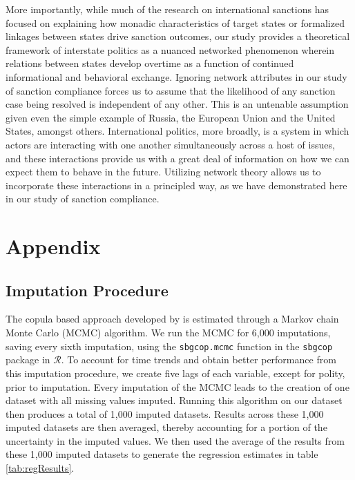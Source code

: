 More importantly, while much of the research on international sanctions has focused on explaining how monadic characteristics of target states or formalized linkages between states drive sanction outcomes, our study provides a theoretical framework of interstate politics as a nuanced networked phenomenon wherein relations between states develop overtime as a function of continued informational and behavioral exchange. Ignoring network attributes in our study of sanction compliance forces us to assume that the likelihood of any sanction case being resolved is independent of any other. This is an untenable assumption given even the simple example of Russia, the European Union and the United States, amongst others. International politics, more broadly, is a system in which actors are interacting with one another simultaneously across a host of issues, and these interactions provide us with a great deal of information on how we can expect them to behave in the future. Utilizing network theory allows us to incorporate these interactions in a principled way, as we have demonstrated here in our study of sanction compliance.

\newpage
\section*{Appendix}
\label{appendix}

\subsection*{Imputation Procedure}
\label{appImp}

The copula based approach developed by \citet{hoff:2007} is estimated through a Markov chain Monte Carlo (MCMC) algorithm. We run the MCMC for 6,000 imputations, saving every sixth imputation, using the \texttt{sbgcop.mcmc} function in the \texttt{sbgcop} package in $\mathcal{R}$. To account for time trends and obtain better performance from this imputation procedure, we create five lags of each variable, except for polity, prior to imputation. Every imputation of the MCMC leads to the creation of one dataset with all missing values imputed. Running this algorithm on our dataset then produces a total of 1,000 imputed datasets. Results across these 1,000 imputed datasets are then averaged, thereby accounting for a portion of the uncertainty in the imputed values. We then used the average of the results from these 1,000 imputed datasets to generate the regression estimates in table \ref{tab:regResults}. 

